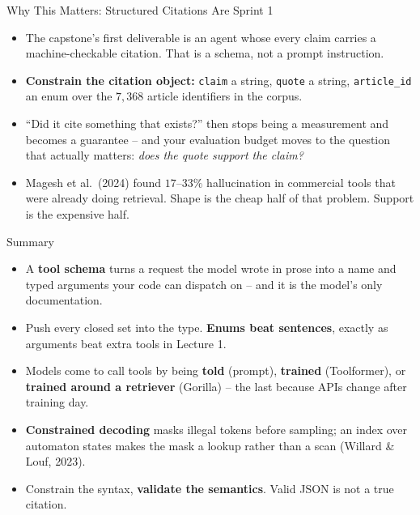 \begin{frame}{Why This Matters: Structured Citations Are Sprint 1}
\begin{itemize}
  \item The capstone's first deliverable is an agent whose every claim carries a machine-checkable citation. That is a schema, not a prompt instruction.
  \pause
  \item \textbf{Constrain the citation object:} \texttt{claim} a string, \texttt{quote} a string, \texttt{article\_id} an enum over the $7{,}368$ article identifiers in the corpus.
  \pause
  \item ``Did it cite something that exists?'' then stops being a measurement and becomes a guarantee -- and your evaluation budget moves to the question that actually matters: \emph{does the quote support the claim?}
  \pause
  \item Magesh et al.\ (2024) found $17$--$33\%$ hallucination in commercial tools that were already doing retrieval. Shape is the cheap half of that problem. Support is the expensive half.
\end{itemize}
\end{frame}

\begin{frame}{Summary}
\begin{itemize}
  \item A \textbf{tool schema} turns a request the model wrote in prose into a name and typed arguments your code can dispatch on -- and it is the model's only documentation.
  \pause
  \item Push every closed set into the type. \textbf{Enums beat sentences}, exactly as arguments beat extra tools in Lecture 1.
  \pause
  \item Models come to call tools by being \textbf{told} (prompt), \textbf{trained} (Toolformer), or \textbf{trained around a retriever} (Gorilla) -- the last because APIs change after training day.
  \pause
  \item \textbf{Constrained decoding} masks illegal tokens before sampling; an index over automaton states makes the mask a lookup rather than a scan (Willard \& Louf, 2023).
  \pause
  \item Constrain the syntax, \textbf{validate the semantics}. Valid JSON is not a true citation.
\end{itemize}
\end{frame}

